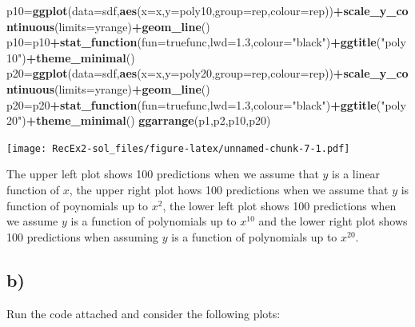 \documentclass[]{article}
\newenvironment{Shaded}{\begin{snugshade}}{\end{snugshade}}
\newcommand{\KeywordTok}[1]{\textcolor[rgb]{0.13,0.29,0.53}{\textbf{#1}}}
\newcommand{\DataTypeTok}[1]{\textcolor[rgb]{0.13,0.29,0.53}{#1}}
\newcommand{\FloatTok}[1]{\textcolor[rgb]{0.00,0.00,0.81}{#1}}
\newcommand{\StringTok}[1]{\textcolor[rgb]{0.31,0.60,0.02}{#1}}
\newcommand{\OperatorTok}[1]{\textcolor[rgb]{0.81,0.36,0.00}{\textbf{#1}}}
\newcommand{\NormalTok}[1]{#1}
\begin{document}
\begin{Shaded}
\begin{Highlighting}[]
\NormalTok{p10=}\KeywordTok{ggplot}\NormalTok{(}\DataTypeTok{data=}\NormalTok{sdf,}\KeywordTok{aes}\NormalTok{(}\DataTypeTok{x=}\NormalTok{x,}\DataTypeTok{y=}\NormalTok{poly10,}\DataTypeTok{group=}\NormalTok{rep,}\DataTypeTok{colour=}\NormalTok{rep))}\OperatorTok{+}\KeywordTok{scale_y_continuous}\NormalTok{(}\DataTypeTok{limits=}\NormalTok{yrange)}\OperatorTok{+}\KeywordTok{geom_line}\NormalTok{()}
\NormalTok{p10=p10}\OperatorTok{+}\KeywordTok{stat_function}\NormalTok{(}\DataTypeTok{fun=}\NormalTok{truefunc,}\DataTypeTok{lwd=}\FloatTok{1.3}\NormalTok{,}\DataTypeTok{colour=}\StringTok{"black"}\NormalTok{)}\OperatorTok{+}\KeywordTok{ggtitle}\NormalTok{(}\StringTok{"poly10"}\NormalTok{)}\OperatorTok{+}\KeywordTok{theme_minimal}\NormalTok{()}
\NormalTok{p20=}\KeywordTok{ggplot}\NormalTok{(}\DataTypeTok{data=}\NormalTok{sdf,}\KeywordTok{aes}\NormalTok{(}\DataTypeTok{x=}\NormalTok{x,}\DataTypeTok{y=}\NormalTok{poly20,}\DataTypeTok{group=}\NormalTok{rep,}\DataTypeTok{colour=}\NormalTok{rep))}\OperatorTok{+}\KeywordTok{scale_y_continuous}\NormalTok{(}\DataTypeTok{limits=}\NormalTok{yrange)}\OperatorTok{+}\KeywordTok{geom_line}\NormalTok{()}
\NormalTok{p20=p20}\OperatorTok{+}\KeywordTok{stat_function}\NormalTok{(}\DataTypeTok{fun=}\NormalTok{truefunc,}\DataTypeTok{lwd=}\FloatTok{1.3}\NormalTok{,}\DataTypeTok{colour=}\StringTok{"black"}\NormalTok{)}\OperatorTok{+}\KeywordTok{ggtitle}\NormalTok{(}\StringTok{"poly20"}\NormalTok{)}\OperatorTok{+}\KeywordTok{theme_minimal}\NormalTok{()}
\KeywordTok{ggarrange}\NormalTok{(p1,p2,p10,p20)}
\end{Highlighting}
\end{Shaded}

\texttt{[image: RecEx2-sol\_files/figure-latex/unnamed-chunk-7-1.pdf]}

The upper left plot shows 100 predictions when we assume that \(y\) is a
linear function of \(x\), the upper right plot hows 100 predictions when
we assume that \(y\) is function of poynomials up to \(x^2\), the lower
left plot shows 100 predictions when we assume \(y\) is a function of
polynomials up to \(x^{10}\) and the lower right plot shows 100
predictions when assuming \(y\) is a function of polynomials up to
\(x^{20}\).

\subsection{b)}\label{b}

Run the code attached and consider the following plots:
\end{document}
